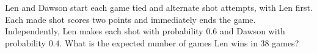 Len and Dawson start each game tied and alternate shot attempts, with Len first. Each made shot scores two points and immediately ends the game. Independently, Len makes each shot with probability $0.6$ and Dawson with probability $0.4$. What is the expected number of games Len wins in $38$ games?
